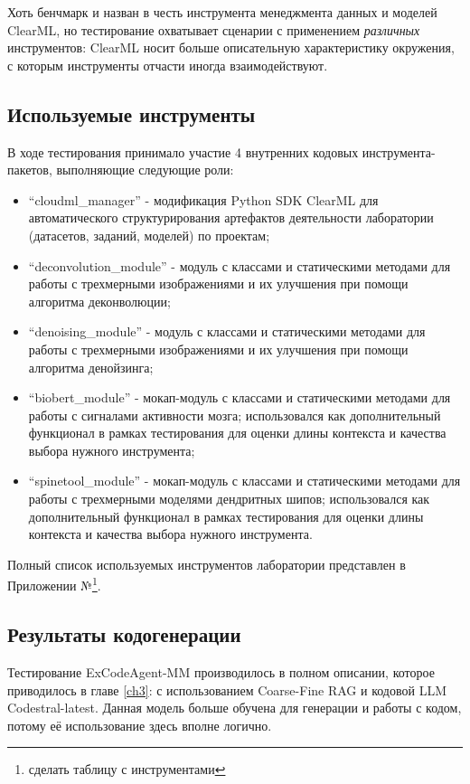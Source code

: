 Хоть бенчмарк и назван в честь инструмента менеджмента данных и моделей ClearML, 
но тестирование охватывает сценарии с применением \textit{различных} инструментов: 
ClearML носит больше описательную характеристику окружения, 
с которым инструменты отчасти иногда взаимодействуют.

\subsection{Используемые инструменты} \label{ch4:sec1:subsec2}
В ходе тестирования принимало участие
4 внутренних кодовых инструмента-пакетов, выполняющие следующие роли:
\begin{itemize}
    \item ``cloudml\_manager'' - модификация Python SDK ClearML для 
автоматического структурирования артефактов деятельности лаборатории (датасетов, заданий, 
моделей) по проектам;
    \item ``deconvolution\_module'' - модуль с классами и статическими методами 
для работы с трехмерными изображениями и их улучшения при помощи алгоритма деконволюции;
    \item ``denoising\_module'' - модуль с классами и статическими методами 
для работы с трехмерными изображениями и их улучшения при помощи алгоритма денойзинга;
    \item ``biobert\_module'' - мокап-модуль с классами и статическими методами для
работы с сигналами активности мозга; использовался как дополнительный функционал в рамках
тестирования для оценки длины контекста и качества выбора нужного инструмента;
    \item ``spinetool\_module'' - мокап-модуль с классами и статическими методами для
работы с трехмерными моделями дендритных шипов; использовался как дополнительный 
функционал в рамках тестирования для оценки длины контекста и 
качества выбора нужного инструмента. 
\end{itemize}

Полный список используемых инструментов лаборатории представлен в 
Приложении №\footnote{сделать таблицу с инструментами}.

\subsection{Результаты кодогенерации} \label{ch4:sec1:subsec3}

Тестирование ExCodeAgent-MM производилось в полном описании, которое приводилось в главе 
\ref{ch3}: с использованием Coarse-Fine RAG и кодовой LLM Codestral-latest. Данная модель
больше обучена для генерации и работы с кодом, потому её использование здесь вполне логично.

